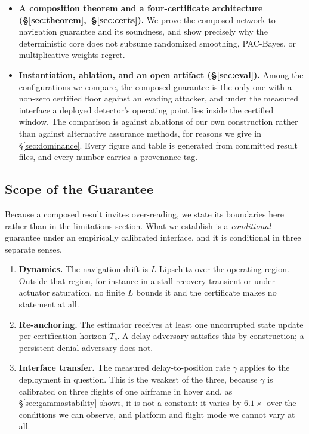 \begin{itemize}
\item \textbf{A composition theorem and a four-certificate architecture
(\S\ref{sec:theorem},~\S\ref{sec:certs}).} We prove the composed
network-to-navigation guarantee and its soundness, and show precisely why the
deterministic core does not subsume randomized smoothing, PAC-Bayes, or
multiplicative-weights regret.

\item \textbf{Instantiation, ablation, and an open artifact
(\S\ref{sec:eval}).} Among the configurations we compare, the composed guarantee
is the only one with a non-zero certified floor against an evading attacker, and
under the measured interface a deployed detector's operating point lies inside
the certified window. The comparison is against ablations of our own
construction rather than against alternative assurance methods, for reasons we
give in \S\ref{sec:dominance}. Every figure and table is generated from
committed result files, and every number carries a provenance tag.
\end{itemize}

\subsection*{Scope of the Guarantee}
\label{sec:scope}
Because a composed result invites over-reading, we state its boundaries here
rather than in the limitations section. What we establish is a
\emph{conditional} guarantee under an empirically calibrated interface, and it
is conditional in three separate senses.

\begin{enumerate}[label=(C\arabic*),leftmargin=2.6em]
\item\label{c:lip} \textbf{Dynamics.} The navigation drift is $L$-Lipschitz over
the operating region. Outside that region, for instance in a stall-recovery
transient or under actuator saturation, no finite $L$ bounds it and the
certificate makes no statement at all.
\item\label{c:anchor} \textbf{Re-anchoring.} The estimator receives at least one
uncorrupted state update per certification horizon $T_c$. A delay adversary
satisfies this by construction; a persistent-denial adversary does not.
\item\label{c:interface} \textbf{Interface transfer.} The measured
delay-to-position rate $\gamma$ applies to the deployment in question. This is
the weakest of the three, because $\gamma$ is calibrated on three flights of one
airframe in hover and, as \S\ref{sec:gammastability} shows, it is not a
constant: it varies by $6.1\times$ over the conditions we can observe, and
platform and flight mode we cannot vary at all.
\end{enumerate}

